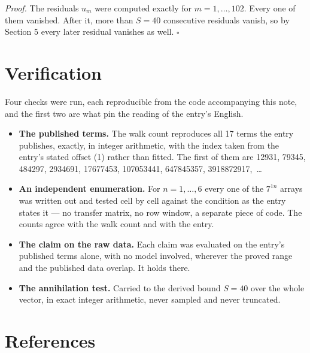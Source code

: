 \documentclass[11pt]{article}
\theoremstyle{definition}
\begin{document}
{\itshape Proof.} The residuals $u_m$ were computed exactly for $m = 1,\dots,102$. Every one of them vanished. After it, more than $S = 40$ consecutive residuals vanish, so by Section 5 every later residual vanishes as well. $\square$

\section{Verification}

Four checks were run, each reproducible from the code accompanying this note, and the first two are what pin the reading of the entry's English.

\begin{itemize}

\item {\bfseries The published terms.} The walk count reproduces all 17 terms the entry publishes, exactly, in integer arithmetic, with the index taken from the entry's stated offset (1) rather than fitted. The first of them are 12931, 79345, 484297, 2934691, 17677453, 107053441, 647845357, 3918872917,~\dots

\item {\bfseries An independent enumeration.} For $n = 1,\dots,6$ every one of the $7^{1n}$ arrays was written out and tested cell by cell against the condition as the entry states it --- no transfer matrix, no row window, a separate piece of code. The counts agree with the walk count and with the entry.

\item {\bfseries The claim on the raw data.} Each claim was evaluated on the entry's published terms alone, with no model involved, wherever the proved range and the published data overlap. It holds there.

\item {\bfseries The annihilation test.} Carried to the derived bound $S = 40$ over the whole vector, in exact integer arithmetic, never sampled and never truncated.

\end{itemize}

\section{References}
\end{document}
